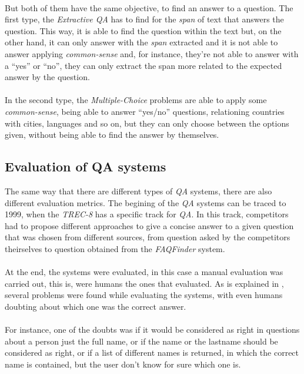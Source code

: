 \paragraph{}
But both of them have the same objective, to find an answer to a question. The first type, the \emph{Extractive QA} has to find for the \emph{span} of text that answers the question. This way, it is able to find the question within the text but, on the other hand, it can only answer with the \emph{span} extracted and it is not able to answer applying \emph{common-sense} and, for instance, they're not able to answer with a ``yes'' or ``no'', they can only extract the span more related to the expected answer by the question.
\paragraph{}
In the second type, the \emph{Multiple-Choice} problems are able to apply some \emph{common-sense}, being able to answer ``yes/no'' questions, relationing countries with cities, languages and so on, but they can only choose between the options given, without being able to find the answer by themselves.
\subsection{Evaluation of QA systems}
\label{sec:qa-evaluation}
The same way that there are different types of \emph{QA} systems, there are also different evaluation metrics. The begining of the \emph{QA} systems can be traced to 1999, when the \emph{TREC-8} has a specific track for \emph{QA}. In this track, competitors had to propose different approaches to give a concise answer to a given question that was chosen from different sources, from question asked by the competitors theirselves to question obtained from the \emph{FAQFinder} system.
\paragraph{}
At the end, the systems were evaluated, in this case a manual evaluation was carried out, this is, were humans the ones that evaluated. As is explained in \cite{Voorhees1999}, several problems were found while evaluating the systems, with even humans doubting about which one was the correct answer.
\paragraph{}
For instance, one of the doubts was if it would be considered as right in questions about a person just the full name, or if the name or the lastname should be considered as right, or if a list of different names is returned, in which the correct name is contained, but the user don't know for sure which one is.
